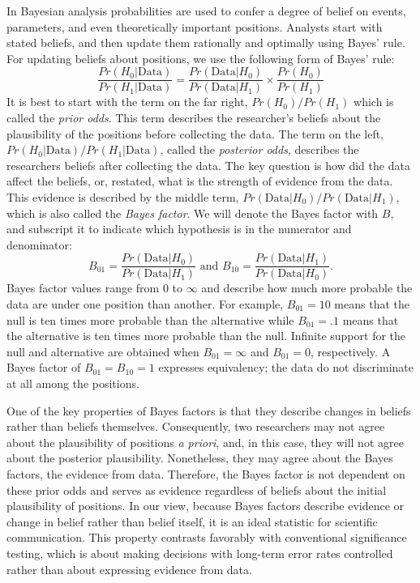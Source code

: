\documentclass[man]{apa6}
\begin{document}
In Bayesian analysis probabilities are used to confer a degree of belief on events, parameters, and even theoretically important positions.  Analysts start with stated beliefs, and then update them rationally and optimally using Bayes' rule.  For updating beliefs about positions, we use the following form of Bayes' rule:
\begin{equation}
\frac{Pr(H_0 | \mbox{Data})}{Pr(H_1 | \mbox{Data})} = \frac{Pr(\mbox{Data} | H_0)}{Pr(\mbox{Data} | H_1)} \times \frac{Pr(H_0)}{Pr (H_1)} 
\end{equation}
It is best to start with the term on the far right, $Pr(H_0)/Pr(H_1)$ which is called the {\em prior odds}.  This term describes the researcher's beliefs about the plausibility of the positions before collecting the data.  The term on the left, $Pr(H_0 | \mbox{Data})/Pr(H_1 | \mbox{Data})$, called the {\em posterior odds}, describes the researchers beliefs after collecting the data.   The key question is how did the data affect the beliefs, or, restated, what is the strength of evidence from the data.  This evidence is described by the middle term,  $Pr(\mbox{Data} | H_0)/Pr(\mbox{Data} | H_1)$, which is also called the {\em Bayes factor}.  We will denote the Bayes factor with $B$, and subscript it to indicate which hypothesis is in the numerator and denominator:
\[
B_{01} = \frac{Pr(\mbox{Data} | H_0)}{Pr(\mbox{Data} | H_1)} \mbox{ and } B_{10} = \frac{Pr(\mbox{Data} | H_1)}{Pr(\mbox{Data} | H_0)}.
\]
Bayes factor values range from 0 to $\infty$ and describe how much more probable the data are under one position than another.  For example, $B_{01}=10$ means that the null is ten times more probable than the alternative while $B_{01}=.1$ means that the alternative is ten times more probable than the null.  Infinite support for the null and alternative are obtained when $B_{01}=\infty$ and $B_{01}=0$, respectively.  A Bayes factor of $B_{01}=B_{10}=1$ expresses equivalency; the data do not discriminate at all among the positions.

One of the key properties of Bayes factors is that they describe changes in beliefs rather than beliefs themselves.  Consequently, two researchers may not agree about the plausibility of positions {\em a priori}, and, in this case, they will not agree about the posterior plausibility.  Nonetheless, they may agree about the Bayes factors, the evidence from data.  Therefore, the Bayes factor is not dependent on these prior odds and serves as evidence regardless of beliefs about the initial plausibility of positions.  In our view, because Bayes factors describe evidence or change in belief rather than belief itself, it is an ideal statistic for scientific communication.  This property contrasts favorably with conventional significance testing, which is about making decisions with long-term error rates controlled rather than about expressing evidence from data. 
\end{document}
